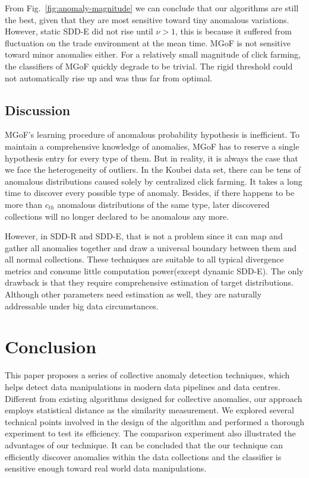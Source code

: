 \documentclass{article}
\begin{document}
			From Fig.~\ref{fig:anomaly-magnitude} we can conclude that our algorithms are still the best, given that they are most sensitive toward tiny anomalous variations. However, static SDD-E did not rise until $\nu > 1$, this is because it suffered from fluctuation on the trade environment at the mean time. MGoF is not sensitive toward minor anomalies either.
			For a relatively small magnitude of click farming, the classifiers of MGoF quickly degrade to be trivial. The rigid threshold could not automatically rise up and was thus far from optimal. 
	
		\subsection{Discussion}
			MGoF's learning procedure of anomalous probability hypothesis is inefficient. To maintain a comprehensive knowledge of anomalies, MGoF has to reserve a single hypothesis entry for every type of them. But in reality, it is always the case that we face the heterogeneity of outliers. In the Koubei data set, there can be tens of anomalous distributions caused solely by centralized click farming. It takes a long time to discover every possible type of anomaly. Besides, if there happens to be more than $c_{th}$ anomalous distributions of the same type, later discovered collections will no longer declared to be anomalous any more.
			
			However, in SDD-R and SDD-E, that is not a problem since it can map and gather all anomalies together and draw a universal boundary between them and all normal collections. These techniques are suitable to all typical divergence metrics and consume little computation power(except dynamic SDD-E). The only drawback is that they require comprehensive estimation of target distributions. Although other parameters need estimation as well, they are naturally addressable under big data circumstances.
	
	\section{Conclusion}\label{sec:conclusion}
		This paper proposes a series of collective anomaly detection techniques, which helps detect data manipulations in modern data pipelines and data centres. Different from existing algorithms designed for collective anomalies, our approach employs statistical distance as the similarity measurement. We explored several technical points involved in the design of the algorithm and performed a thorough experiment to test its efficiency. The comparison experiment also illustrated the advantages of our technique. It can be concluded that the our technique can efficiently discover anomalies within the data collections and the classifier is sensitive enough toward real world data manipulations. 



\end{document}
